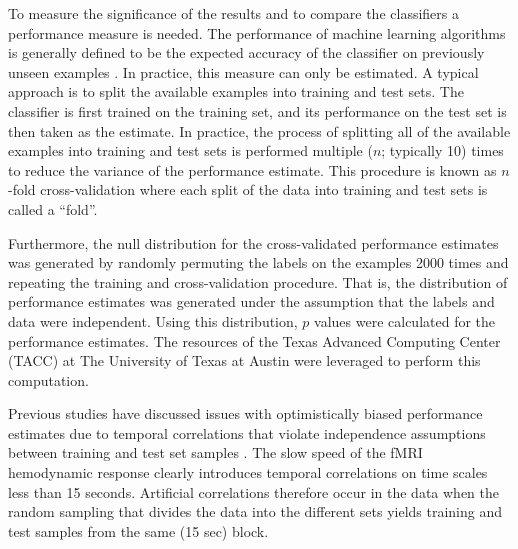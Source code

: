\documentclass[5p,authoryear]{elsarticle}
\begin{document}
To measure the significance of the results and to compare the classifiers a performance measure is needed.
The performance of machine learning algorithms is generally defined to be the expected accuracy of the classifier on previously unseen examples \citep{Bishop2006}.
In practice, this measure can only be estimated.
A typical approach is to split the available examples into training and test sets.
The classifier is first trained on the training set, and its performance on the test set is then taken as the estimate.
In practice, the process of splitting all of the available examples into training and test sets is performed multiple ($n$; typically 10) times to reduce the variance of the performance estimate.
This procedure is known as $n$-fold cross-validation \citep{Kohavi1995} where each split of the data into training and test sets is called a ``fold''.

Furthermore, the null distribution for the cross-validated performance estimates was generated by randomly permuting the labels on the examples 2000 times and repeating the training and cross-validation procedure.
That is, the distribution of performance estimates was generated under the assumption that the labels and data were independent.
Using this distribution, $p$ values were calculated for the performance estimates.
The resources of the Texas Advanced Computing Center (TACC) at The University of Texas at Austin were leveraged to perform this computation.

Previous studies have discussed issues with optimistically biased performance estimates due to temporal correlations that violate independence assumptions between training and test set samples \citep{Pereira2009}. 
The slow speed of the fMRI hemodynamic response clearly introduces temporal correlations on time scales less than 15 seconds.
Artificial correlations therefore occur in the data when the random sampling that divides the data into the different sets yields training and test samples from the same (15 sec) block.
\end{document}
